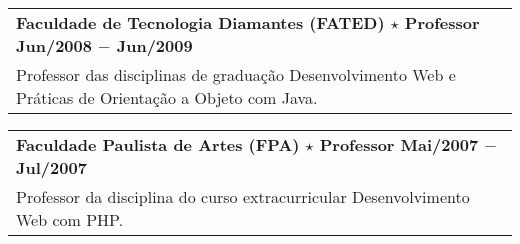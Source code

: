 \documentclass[a4paper, oneside, final]{scrartcl}
\newcommand{\vspc}{\vspace{0.15cm}} %
\begin{document}
\begin{center}
\begin{tabularx}{1\linewidth}{X}
{\bf Faculdade de Tecnologia Diamantes (FATED) $\star$ Professor \hfill Jun/2008 $-$ Jun/2009} \\
Professor das disciplinas de graduação Desenvolvimento Web e Práticas de Orientação a Objeto com Java. \vspc\\
\end{tabularx}

\begin{tabularx}{1\linewidth}{X}
{\bf Faculdade Paulista de Artes (FPA) $\star$ Professor  \hfill Mai/2007 $-$ Jul/2007} \\
Professor da disciplina do curso extracurricular Desenvolvimento Web com PHP. \vspc\\
\end{tabularx}


\end{center}
\end{document}
